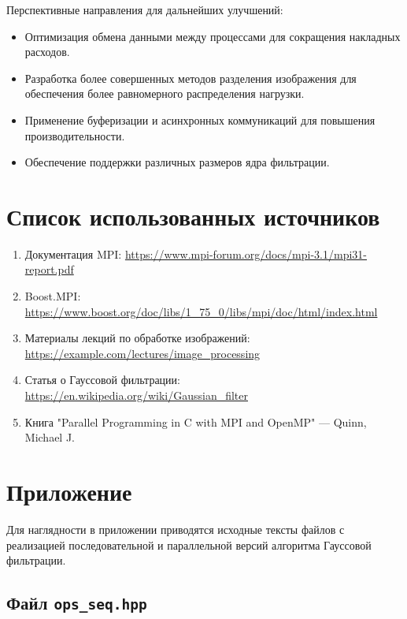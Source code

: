 \documentclass[12pt]{article}
\begin{document}
Перспективные направления для дальнейших улучшений:
\begin{itemize}
    \item Оптимизация обмена данными между процессами для сокращения накладных расходов.
    \item Разработка более совершенных методов разделения изображения для обеспечения более равномерного распределения нагрузки.
    \item Применение буферизации и асинхронных коммуникаций для повышения производительности.
    \item Обеспечение поддержки различных размеров ядра фильтрации.
\end{itemize}


\section{Список использованных источников}
\begin{enumerate}
   \item Документация MPI: \url{https://www.mpi-forum.org/docs/mpi-3.1/mpi31-report.pdf}
    \item Boost.MPI: \url{https://www.boost.org/doc/libs/1_75_0/libs/mpi/doc/html/index.html}
    \item Материалы лекций по обработке изображений: \url{https://example.com/lectures/image_processing}
    \item Статья о Гауссовой фильтрации: \url{https://en.wikipedia.org/wiki/Gaussian_filter}
     \item Книга "Parallel Programming in C with MPI and OpenMP" — Quinn, Michael J.
\end{enumerate}


\appendix
\section*{Приложение}

Для наглядности в приложении приводятся исходные тексты файлов с реализацией последовательной и параллельной версий алгоритма Гауссовой фильтрации.

\subsection*{Файл \texttt{ops\_seq.hpp}}
\end{document}
